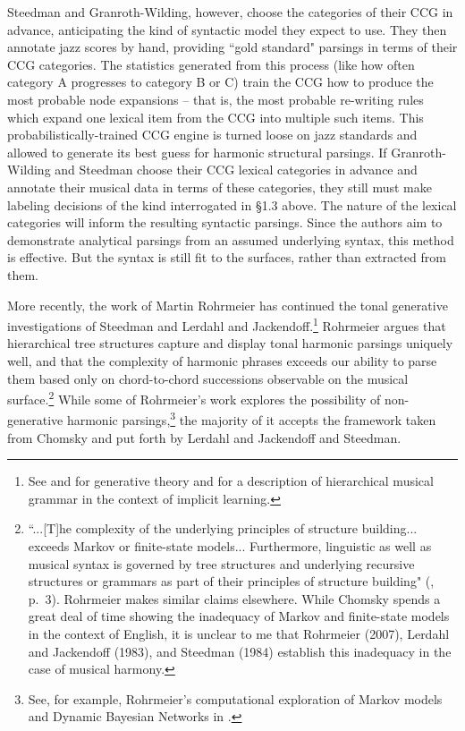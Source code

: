 Steedman and Granroth-Wilding, however, choose the categories of their CCG in advance, anticipating the kind of syntactic model they expect to use.  They then annotate jazz scores by hand, providing ``gold standard" parsings in terms of their CCG categories.  The statistics generated from this process (like how often category A progresses to category B or C) train the CCG how to produce the most probable node expansions -- that is, the most probable re-writing rules which expand one lexical item from the CCG into multiple such items.  This probabilistically-trained CCG engine is turned loose on jazz standards and allowed to generate its best guess for harmonic structural parsings.  If Granroth-Wilding and Steedman choose their CCG lexical categories in advance and annotate their musical data in terms of these categories, they still must make labeling decisions of the kind interrogated in \S 1.3 above.  The nature of the lexical categories will inform the resulting syntactic parsings.  Since the authors aim to demonstrate analytical parsings from an assumed underlying syntax, this method is effective.  But the syntax is still fit to the surfaces, rather than extracted from them.

More recently, the work of Martin Rohrmeier has continued the tonal generative investigations of Steedman and Lerdahl and Jackendoff.\footnote{See \cite{rohrmeier2007} and \cite{rohrmeier2011} for generative theory and \cite{rohrmeier2014} for a description of hierarchical musical grammar in the context of implicit learning.}  Rohrmeier argues that hierarchical tree structures capture and display tonal harmonic parsings uniquely well, and that the complexity of harmonic phrases exceeds our ability to parse them based only on chord-to-chord successions observable on the musical surface.\footnote{``...[T]he complexity of the underlying principles of structure building... exceeds Markov or finite-state models... Furthermore, linguistic as well as musical syntax is governed by tree structures and underlying recursive structures or grammars as part of their principles of structure building" (\cite{rohrmeier2014}, p.\ 3).  Rohrmeier makes similar claims elsewhere.  While Chomsky spends a great deal of time showing the inadequacy of Markov and finite-state models in the context of English, it is unclear to me that Rohrmeier (2007), Lerdahl and Jackendoff (1983), and Steedman (1984) establish this inadequacy in the case of musical harmony.}  While some of Rohrmeier's work explores the possibility of non-generative harmonic parsings,\footnote{See, for example, Rohrmeier's computational exploration of Markov models and Dynamic Bayesian Networks in \cite{rgra2012}.} the majority of it accepts the framework taken from Chomsky and put forth by Lerdahl and Jackendoff and Steedman.

